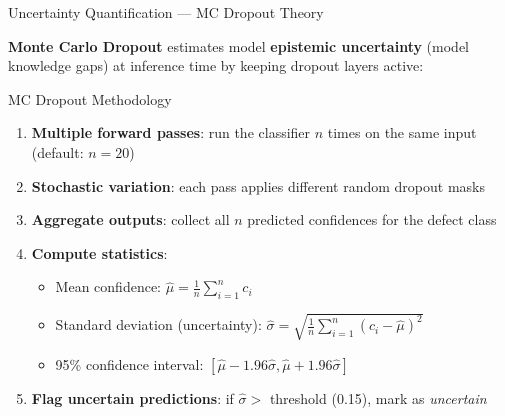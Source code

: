 \documentclass[10pt]{beamer}
\begin{document}
\begin{frame}{Uncertainty Quantification --- MC Dropout Theory}

\small
\textbf{Monte Carlo Dropout} estimates model \textbf{epistemic uncertainty} (model knowledge gaps) at inference time by keeping dropout layers active:

\vspace{8pt}
\begin{block}{MC Dropout Methodology}
\begin{enumerate}\setlength{\itemsep}{6pt}
    \item \textbf{Multiple forward passes}: run the classifier $n$ times on the same input (default: $n=20$)
    \item \textbf{Stochastic variation}: each pass applies different random dropout masks
    \item \textbf{Aggregate outputs}: collect all $n$ predicted confidences for the defect class
    \item \textbf{Compute statistics}: 
    \begin{itemize}
        \item Mean confidence: $\hat{\mu} = \frac{1}{n} \sum_{i=1}^{n} c_i$
        \item Standard deviation (uncertainty): $\hat{\sigma} = \sqrt{\frac{1}{n}\sum_{i=1}^{n}(c_i - \hat{\mu})^2}$
        \item 95\% confidence interval: $[\hat{\mu} - 1.96\hat{\sigma}, \hat{\mu} + 1.96\hat{\sigma}]$
    \end{itemize}
    \item \textbf{Flag uncertain predictions}: if $\hat{\sigma} >$ threshold (0.15), mark as \textit{uncertain}
\end{enumerate}
\end{block}

\end{frame}
\end{document}

